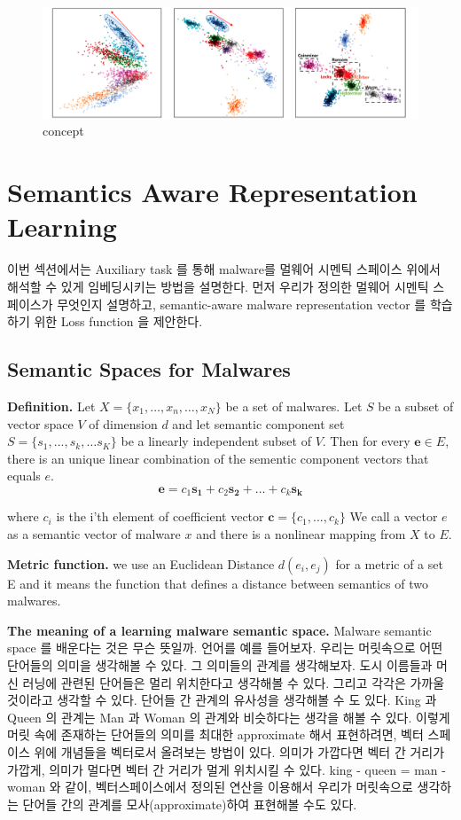 \begin{figure}[!htb] %
  \includegraphics[width=\textwidth]{../../figures/concept.pdf}
  \caption{concept}
  \label{fig:concept}
\end{figure}

\section{Semantics Aware Representation Learning}
이번 섹션에서는 Auxiliary task 를 통해 malware를 멀웨어 시멘틱 스페이스 위에서 해석할 수 있게 임베딩시키는 방법을 설명한다. 먼저 우리가 정의한 멀웨어 시멘틱 스페이스가 무엇인지 설명하고, semantic-aware malware representation vector 를 학습하기 위한 Loss function 을 제안한다.

\subsection{Semantic Spaces for Malwares}

\textbf{Definition. }
Let $X = \{x_1, …, x_n, …, x_N\}$ be a set of malwares.
Let $S$ be a subset of vector space $V$ of dimension $d$ and let semantic component set $S = \{s_1, ... , s_k, … s_K\}$ be a linearly independent subset of $V$.  
Then for every $\mathbf{e} \in E$, there is an unique linear combination of the sementic component vectors that equals $e$.
\[
\mathbf{e} = c_1\mathbf{s_1} + c_2\mathbf{s_2} + … + c_k\mathbf{s_k} 
\]

where $c_i$ is the i’th element of coefficient vector $ \mathbf{c} = \{c_1, ... , c_k\}$
We call a vector $e$ as a semantic vector of malware $x$ and there is a nonlinear mapping from $X$ to $E$. 

\textbf{Metric function. }
we use an Euclidean Distance $d(e_i, e_j)$ for a metric of a set E and it means the function that defines a distance between  semantics of two malwares. 

\textbf{The meaning of a learning malware semantic space. }
Malware semantic space 를 배운다는 것은 무슨 뜻일까.
언어를 예를 들어보자. 우리는 머릿속으로 어떤 단어들의 의미을 생각해볼 수 있다. 그 의미들의 관계를 생각해보자. 도시 이름들과 머신 러닝에 관련된 단어들은 멀리 위치한다고 생각해볼 수 있다. 그리고 각각은 가까울 것이라고 생각할 수 있다. 단어들 간 관계의 유사성을 생각해볼 수 도 있다. King 과 Queen 의 관계는 Man 과 Woman 의 관계와 비슷하다는 생각을 해볼 수 있다. 이렇게 머릿 속에 존재하는 단어들의 의미를 최대한 approximate 해서 표현하려면, 벡터 스페이스 위에 개념들을 벡터로서 올려보는 방법이 있다. 의미가 가깝다면 벡터 간 거리가 가깝게,  의미가 멀다면 벡터 간 거리가 멀게 위치시킬 수 있다. king - queen = man - woman 와 같이, 벡터스페이스에서 정의된 연산을 이용해서 우리가 머릿속으로 생각하는 단어들 간의 관계를 모사(approximate)하여 표현해볼 수도 있다. 

